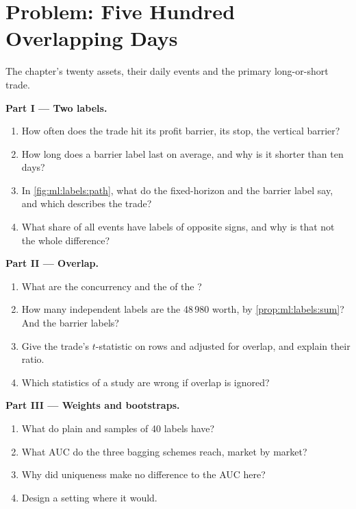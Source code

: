 \section{Problem: Five Hundred Overlapping Days}

\begin{problem}\label{pb:ml:targets-labels-and-sample-weights:1}
The chapter's twenty assets, their daily events and the primary long-or-short trade.

\medskip\noindent\textbf{Part I --- Two labels.}
\begin{enumerate}
\item How often does the trade hit its profit barrier, its stop, the vertical barrier?
\item How long does a barrier label last on average, and why is it shorter than ten days?
\item In \cref{fig:ml:labels:path}, what do the fixed-horizon and the barrier label say, and which describes the trade?
\item What share of all events have labels of opposite signs, and why is that not the whole difference?
\end{enumerate}

\medskip\noindent\textbf{Part II --- Overlap.}
\begin{enumerate}[resume]
\item What are the concurrency and the  of the ?
\item How many independent labels are the 48\,980 worth, by \cref{prop:ml:labels:sum}? And the barrier labels?
\item Give the trade's $t$-statistic on rows and adjusted for overlap, and explain their ratio.
\item Which statistics of a study are wrong if overlap is ignored?
\end{enumerate}

\medskip\noindent\textbf{Part III --- Weights and bootstraps.}
\begin{enumerate}[resume]
\item What  do plain and  samples of 40 labels have?
\item What AUC do the three bagging schemes reach, market by market?
\item Why did uniqueness make no difference to the AUC here?
\item Design a setting where it would.
\end{enumerate}


\end{problem}
